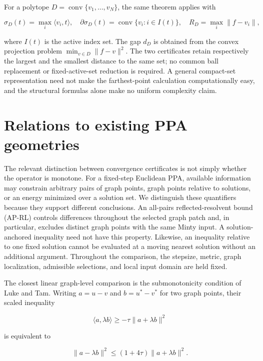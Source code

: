 \documentclass[11pt,a4paper]{article}
\theoremstyle{plain}
\theoremstyle{definition}
\theoremstyle{remark}
\begin{document}
For a polytope \(D=\operatorname{conv}\{v_1,\ldots,v_N\}\), the same
theorem applies with

\[
\sigma_D(t)=\max_i\langle v_i,t\rangle,
\quad
\partial\sigma_D(t)=\operatorname{conv}\{v_i:i\in I(t)\},
\quad
R_D=\max_i\|f-v_i\|,
\tag{5.42}
\]

where \(I(t)\) is the active index set. The gap \(d_D\) is obtained from
the convex projection problem \(\min_{v\in D}\|f-v\|^2\). The two
certificates retain respectively the largest and the smallest distance
to the same set; no common ball replacement or fixed-active-set
reduction is required. A general compact-set representation need not
make the farthest-point calculation computationally easy, and the
structural formulas alone make no uniform complexity claim.

\hypertarget{relations-to-existing-ppa-geometries}{%
\section{Relations to existing PPA
geometries}\label{relations-to-existing-ppa-geometries}}

The relevant distinction between convergence certificates is not simply
whether the operator is monotone. For a fixed-step Euclidean PPA,
available information may constrain arbitrary pairs of graph points,
graph points relative to solutions, or an energy minimized over a
solution set. We distinguish these quantifiers because they support
different conclusions. An all-pairs reflected-resolvent bound (AP-RL)
controls differences throughout the selected graph patch and, in
particular, excludes distinct graph points with the same Minty input. A
solution-anchored inequality need not have this property. Likewise, an
inequality relative to one fixed solution cannot be evaluated at a
moving nearest solution without an additional argument. Throughout the
comparison, the stepsize, metric, graph localization, admissible
selections, and local input domain are held fixed.

The closest linear graph-level comparison is the submonotonicity
condition of Luke and Tam. Writing \(a=u-v\) and \(b=u^*-v^*\) for two
graph points, their scaled inequality

\[
\langle a,\lambda b\rangle\ge-\tau\|a+\lambda b\|^2
\]

is equivalent to

\[
\|a-\lambda b\|^2\le(1+4\tau)\|a+\lambda b\|^2.
\]
\end{document}
